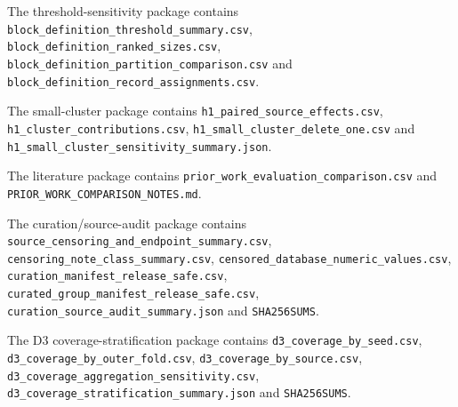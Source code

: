 \documentclass[10pt]{article}
\begin{document}
The threshold-sensitivity package contains \texttt{block\_\allowbreak{}definition\_\allowbreak{}threshold\_\allowbreak{}summary.csv}, \texttt{block\_\allowbreak{}definition\_\allowbreak{}ranked\_\allowbreak{}sizes.csv}, \texttt{block\_\allowbreak{}definition\_\allowbreak{}partition\_\allowbreak{}comparison.csv} and \texttt{block\_\allowbreak{}definition\_\allowbreak{}record\_\allowbreak{}assignments.csv}.

The small-cluster package contains \texttt{h1\_\allowbreak{}paired\_\allowbreak{}source\_\allowbreak{}effects.csv}, \texttt{h1\_\allowbreak{}cluster\_\allowbreak{}contributions.csv}, \texttt{h1\_\allowbreak{}small\_\allowbreak{}cluster\_\allowbreak{}delete\_\allowbreak{}one.csv} and \texttt{h1\_\allowbreak{}small\_\allowbreak{}cluster\_\allowbreak{}sensitivity\_\allowbreak{}summary.json}.

The literature package contains \texttt{prior\_\allowbreak{}work\_\allowbreak{}evaluation\_\allowbreak{}comparison.csv} and \texttt{PRIOR\_\allowbreak{}WORK\_\allowbreak{}COMPARISON\_\allowbreak{}NOTES.md}.

The curation/source-audit package contains \texttt{source\_\allowbreak{}censoring\_\allowbreak{}and\_\allowbreak{}endpoint\_\allowbreak{}summary.csv}, \texttt{censoring\_\allowbreak{}note\_\allowbreak{}class\_\allowbreak{}summary.csv}, \texttt{censored\_\allowbreak{}database\_\allowbreak{}numeric\_\allowbreak{}values.csv}, \texttt{curation\_\allowbreak{}manifest\_\allowbreak{}release\_\allowbreak{}safe.csv}, \texttt{curated\_\allowbreak{}group\_\allowbreak{}manifest\_\allowbreak{}release\_\allowbreak{}safe.csv}, \texttt{curation\_\allowbreak{}source\_\allowbreak{}audit\_\allowbreak{}summary.json} and \texttt{SHA256SUMS}.

The D3 coverage-stratification package contains \texttt{d3\_\allowbreak{}coverage\_\allowbreak{}by\_\allowbreak{}seed.csv}, \texttt{d3\_\allowbreak{}coverage\_\allowbreak{}by\_\allowbreak{}outer\_\allowbreak{}fold.csv}, \texttt{d3\_\allowbreak{}coverage\_\allowbreak{}by\_\allowbreak{}source.csv}, \texttt{d3\_\allowbreak{}coverage\_\allowbreak{}aggregation\_\allowbreak{}sensitivity.csv}, \texttt{d3\_\allowbreak{}coverage\_\allowbreak{}stratification\_\allowbreak{}summary.json} and \texttt{SHA256SUMS}.
\end{document}

